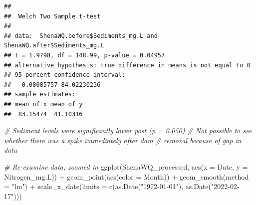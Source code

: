 \documentclass[
  12pt,
]{article}
\newenvironment{Shaded}{\begin{snugshade}}{\end{snugshade}}
\newcommand{\AttributeTok}[1]{\textcolor[rgb]{0.77,0.63,0.00}{#1}}
\newcommand{\CommentTok}[1]{\textcolor[rgb]{0.56,0.35,0.01}{\textit{#1}}}
\newcommand{\ConstantTok}[1]{\textcolor[rgb]{0.00,0.00,0.00}{#1}}
\newcommand{\FunctionTok}[1]{\textcolor[rgb]{0.00,0.00,0.00}{#1}}
\newcommand{\NormalTok}[1]{#1}
\newcommand{\OtherTok}[1]{\textcolor[rgb]{0.56,0.35,0.01}{#1}}
\newcommand{\SpecialCharTok}[1]{\textcolor[rgb]{0.00,0.00,0.00}{#1}}
\newcommand{\StringTok}[1]{\textcolor[rgb]{0.31,0.60,0.02}{#1}}
\begin{document}
\begin{Shaded}
\end{Shaded}

\begin{verbatim}
## 
##  Welch Two Sample t-test
## 
## data:  ShenaWQ.before$Sediments_mg.L and ShenaWQ.after$Sediments_mg.L
## t = 1.9798, df = 148.99, p-value = 0.04957
## alternative hypothesis: true difference in means is not equal to 0
## 95 percent confidence interval:
##   0.08085757 84.02230236
## sample estimates:
## mean of x mean of y 
##  83.15474  41.10316
\end{verbatim}

\begin{Shaded}
\begin{Highlighting}[]
\CommentTok{\# Sediment levels were significantly lower post (p = 0.050)}
\CommentTok{\# Not possible to see whether there was a spike immediately after dam }
\CommentTok{\# removal because of gap in data}
\end{Highlighting}
\end{Shaded}

\newpage

\begin{Shaded}
\begin{Highlighting}[]
\CommentTok{\# Re{-}examine data, zoomed in}
\FunctionTok{ggplot}\NormalTok{(ShenaWQ\_processed, }\FunctionTok{aes}\NormalTok{(}\AttributeTok{x =}\NormalTok{ Date, }\AttributeTok{y =}\NormalTok{ Nitrogen\_mg.L)) }\SpecialCharTok{+}
  \FunctionTok{geom\_point}\NormalTok{(}\FunctionTok{aes}\NormalTok{(}\AttributeTok{color =}\NormalTok{ Month)) }\SpecialCharTok{+}
  \FunctionTok{geom\_smooth}\NormalTok{(}\AttributeTok{method =} \StringTok{"lm"}\NormalTok{) }\SpecialCharTok{+}
  \FunctionTok{scale\_x\_date}\NormalTok{(}\AttributeTok{limits =} \FunctionTok{c}\NormalTok{(}\FunctionTok{as.Date}\NormalTok{(}\StringTok{"1972{-}01{-}01"}\NormalTok{), }
                          \FunctionTok{as.Date}\NormalTok{(}\StringTok{"2022{-}02{-}17"}\NormalTok{)))}
\end{Highlighting}
\end{Shaded}
\end{document}
